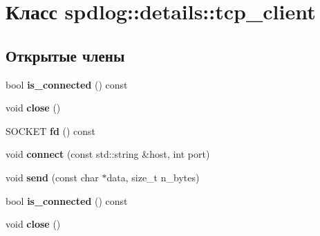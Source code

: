 \hypertarget{classspdlog_1_1details_1_1tcp__client}{}\section{Класс spdlog\+:\+:details\+:\+:tcp\+\_\+client}
\label{classspdlog_1_1details_1_1tcp__client}
\subsection*{Открытые члены}
\begin{DoxyCompactItemize}
\item 
\mbox{\label{classspdlog_1_1details_1_1tcp__client_a20d9e3f5646c9ea65b96c66437867264}} 
bool {\bfseries is\+\_\+connected} () const
\item 
\mbox{\label{classspdlog_1_1details_1_1tcp__client_ad8765cb07a6fd30e6152d4e1dde7ebe5}} 
void {\bfseries close} ()
\item 
\mbox{\label{classspdlog_1_1details_1_1tcp__client_ab95c4eb432cc859a7cf8b5e44e71ab00}} 
S\+O\+C\+K\+ET {\bfseries fd} () const
\item 
\mbox{\label{classspdlog_1_1details_1_1tcp__client_a49ee8323af98d73af42e4c76ebb13f2d}} 
void {\bfseries connect} (const std\+::string \&host, int port)
\item 
\mbox{\label{classspdlog_1_1details_1_1tcp__client_a822dbb5a77626f1b16f953f5a41d2756}} 
void {\bfseries send} (const char $\ast$data, size\+\_\+t n\+\_\+bytes)
\item 
\mbox{\label{classspdlog_1_1details_1_1tcp__client_a20d9e3f5646c9ea65b96c66437867264}} 
bool {\bfseries is\+\_\+connected} () const
\item 
\mbox{\label{classspdlog_1_1details_1_1tcp__client_ad8765cb07a6fd30e6152d4e1dde7ebe5}} 
void {\bfseries close} ()
\item 
\mbox{\label{classspdlog_1_1details_1_1tcp__client_a4178e8cc4e83df5c8dfe40e0dc8a261f}} 

\end{DoxyCompactItemize}
